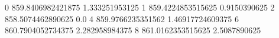 0 859.8406982421875 1.333251953125
1 859.4224853515625 0.9150390625
2 858.5074462890625 0.0
4 859.9766235351562 1.46917724609375
6 860.7904052734375 2.282958984375
8 861.0162353515625 2.5087890625
